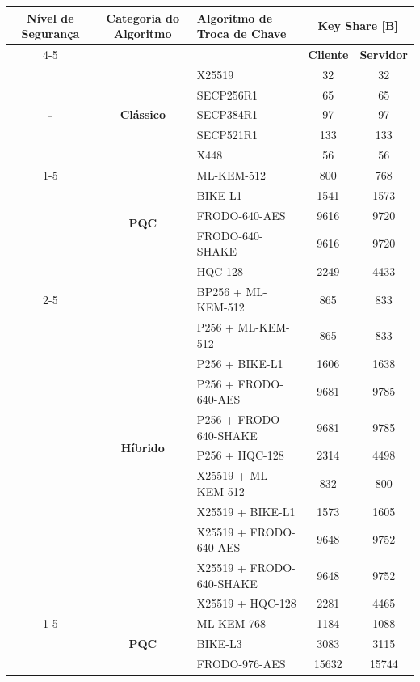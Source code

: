 \documentclass[10pt]{article}
\begin{document}
\centering
\small
\begin{tabular}{@{}c c l c c@{}}
\toprule
\multirow[c]{2}{*}{\textbf{Nível de Segurança}} & \multirow[c]{2}{*}{\textbf{Categoria do Algoritmo}} & \multirow[c]{2}{*}{\textbf{Algoritmo de Troca de Chave}} & \multicolumn{2}{c}{\textbf{Key Share [B]}} \\
\cmidrule(lr){4-5}
\addlinespace[0.45ex]
 &  &  & \textbf{Cliente} & \textbf{Servidor} \\
\midrule
\multirow[c]{5}{*}{\textbf{-}} & \multirow[c]{5}{*}{\textbf{Clássico}} & X25519 & 32 & 32 \\
 &  & SECP256R1 & 65 & 65 \\
 &  & SECP384R1 & 97 & 97 \\
 &  & SECP521R1 & 133 & 133 \\
 &  & X448 & 56 & 56 \\
\cmidrule(lr){1-5}
\multirow[c]{16}{*}{\textbf{I}} & \multirow[c]{5}{*}{\textbf{PQC}} & ML-KEM-512 & 800 & 768 \\
 &  & BIKE-L1 & 1541 & 1573 \\
 &  & FRODO-640-AES & 9616 & 9720 \\
 &  & FRODO-640-SHAKE & 9616 & 9720 \\
 &  & HQC-128 & 2249 & 4433 \\
\cmidrule(lr){2-5}
 & \multirow[c]{11}{*}{\textbf{Híbrido}} & BP256 + ML-KEM-512 & 865 & 833 \\
 &  & P256 + ML-KEM-512 & 865 & 833 \\
 &  & P256 + BIKE-L1 & 1606 & 1638 \\
 &  & P256 + FRODO-640-AES & 9681 & 9785 \\
 &  & P256 + FRODO-640-SHAKE & 9681 & 9785 \\
 &  & P256 + HQC-128 & 2314 & 4498 \\
 &  & X25519 + ML-KEM-512 & 832 & 800 \\
 &  & X25519 + BIKE-L1 & 1573 & 1605 \\
 &  & X25519 + FRODO-640-AES & 9648 & 9752 \\
 &  & X25519 + FRODO-640-SHAKE & 9648 & 9752 \\
 &  & X25519 + HQC-128 & 2281 & 4465 \\
\cmidrule(lr){1-5}
\multirow[c]{18}{*}{\textbf{III}} & \multirow[c]{5}{*}{\textbf{PQC}} & ML-KEM-768 & 1184 & 1088 \\
 &  & BIKE-L3 & 3083 & 3115 \\
 &  & FRODO-976-AES & 15632 & 15744 \\

\end{tabular}
\end{document}
